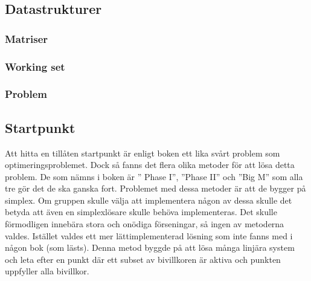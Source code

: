 \subsection{Datastrukturer}
\subsubsection{Matriser}
\subsubsection{Working set}
\subsubsection{Problem}

\subsection{Startpunkt}
Att hitta en tillåten startpunkt är enligt boken ett lika svårt problem som optimeringsproblemet. Dock så fanns det flera olika metoder för att lösa detta problem. De som nämns i boken är '' Phase I'', ''Phase II'' och ''Big M'' som alla tre gör det de ska ganska fort. Problemet med dessa metoder är att de bygger på simplex. Om gruppen skulle välja att implementera någon av dessa skulle det betyda att även en simplexlösare skulle behöva implementeras. Det skulle förmodligen innebära stora  och onödiga förseningar, så ingen av metoderna valdes. Istället valdes ett mer lättimplementerad lösning som inte fanns med i någon bok (som lästs). Denna metod byggde på att lösa många linjära system och leta efter en punkt där ett subset av bivillkoren är aktiva och punkten uppfyller alla bivillkor.

